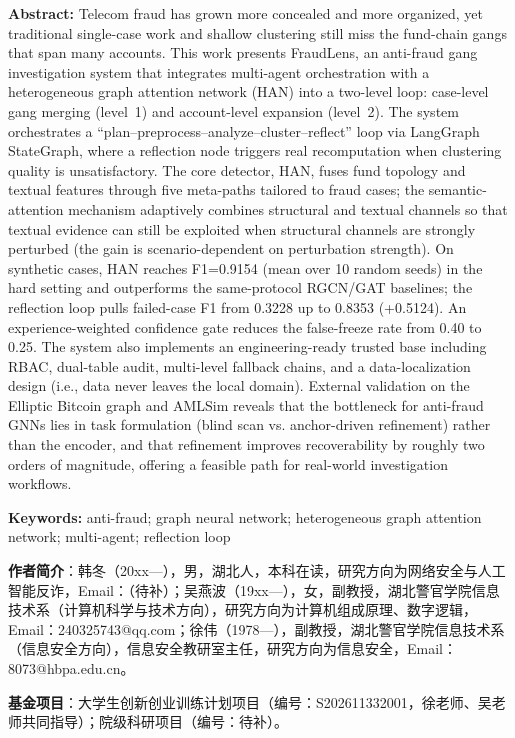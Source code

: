 \documentclass[12pt,a4paper]{ctexart}
\begin{document}
\noindent\textbf{Abstract:} Telecom fraud has grown more concealed and more organized, yet traditional single-case work and shallow clustering still miss the fund-chain gangs that span many accounts. This work presents FraudLens, an anti-fraud gang investigation system that integrates multi-agent orchestration with a heterogeneous graph attention network (HAN) into a two-level loop: case-level gang merging (level~1) and account-level expansion (level~2). The system orchestrates a ``plan--preprocess--analyze--cluster--reflect'' loop via LangGraph StateGraph, where a reflection node triggers real recomputation when clustering quality is unsatisfactory. The core detector, HAN, fuses fund topology and textual features through five meta-paths tailored to fraud cases; the semantic-attention mechanism adaptively combines structural and textual channels so that textual evidence can still be exploited when structural channels are strongly perturbed (the gain is scenario-dependent on perturbation strength). On synthetic cases, HAN reaches F1=0.9154 (mean over 10 random seeds) in the hard setting and outperforms the same-protocol RGCN/GAT baselines; the reflection loop pulls failed-case F1 from 0.3228 up to 0.8353 (+0.5124). An experience-weighted confidence gate reduces the false-freeze rate from 0.40 to 0.25. The system also implements an engineering-ready trusted base including RBAC, dual-table audit, multi-level fallback chains, and a data-localization design (i.e., data never leaves the local domain). External validation on the Elliptic Bitcoin graph and AMLSim reveals that the bottleneck for anti-fraud GNNs lies in task formulation (blind scan vs. anchor-driven refinement) rather than the encoder, and that refinement improves recoverability by roughly two orders of magnitude, offering a feasible path for real-world investigation workflows.

\noindent\textbf{Keywords:} anti-fraud; graph neural network; heterogeneous graph attention network; multi-agent; reflection loop

\noindent\textbf{作者简介}：韩冬（20xx—），男，湖北人，本科在读，研究方向为网络安全与人工智能反诈，Email：（待补）；吴燕波（19xx—），女，副教授，湖北警官学院信息技术系（计算机科学与技术方向），研究方向为计算机组成原理、数字逻辑，Email：240325743@qq.com；徐伟（1978—），副教授，湖北警官学院信息技术系（信息安全方向），信息安全教研室主任，研究方向为信息安全，Email：8073@hbpa.edu.cn。

\noindent\textbf{基金项目}：大学生创新创业训练计划项目（编号：S202611332001，徐老师、吴老师共同指导）；院级科研项目（编号：待补）。
\end{document}
